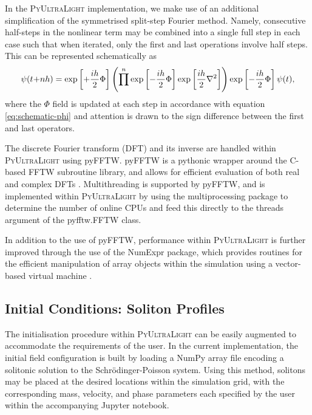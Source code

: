 \documentclass[a4paper,11pt]{article}
\newcommand{\PyUltraLight}{\textsc{PyUltraLight }}
\begin{document}
In the \PyUltraLight implementation, we make use of an additional simplification of the symmetrised split-step Fourier method. Namely, consecutive half-steps in the nonlinear term may be combined into a single full step in each case such that when iterated, only the first and last operations involve half steps. This can be represented schematically as 
\begin{equation}
    \psi(t\hspace*{-.2em}+\hspace*{-.2em}nh)=\operatorname{exp}\left[+\frac{ih}{2}\Phi\right]\left(\prod^n\operatorname{exp}\left[-\frac{ih}{2}\Phi\right]\operatorname{exp}\left[\frac{ih}{2}\nabla^2\right]\right)\operatorname{exp}\left[-\frac{ih}{2}\Phi\right]\psi(t),
\end{equation}
where the $\Phi$ field is updated at each step in accordance with equation \ref{eq:schematic-phi} and attention is drawn to the sign difference between the first and last operators.

The discrete Fourier transform (DFT) and its inverse are handled within \PyUltraLight using pyFFTW. pyFFTW is a pythonic wrapper around the C-based FFTW subroutine library, and allows for efficient evaluation of both real and complex DFTs \cite{pyfftw} \cite{fftw} \cite{Frigo2005}.  Multithreading is supported by pyFFTW, and is implemented within \PyUltraLight by using the multiprocessing package to determine the number of online CPUs and feed this directly to the threads argument of the pyfftw.FFTW class. 

In addition to the use of pyFFTW, performance within \PyUltraLight is further improved through the use of the NumExpr package, which provides routines for the efficient manipulation of array objects within the simulation using a vector-based virtual machine \cite{numexpr}. 

\subsection{Initial Conditions: Soliton Profiles}\label{sec:soliton-profiles}

The initialisation procedure within \PyUltraLight can be easily augmented to accommodate the requirements of the user. In the current implementation, the initial field configuration is built by loading a NumPy array file encoding a solitonic solution to the Schr{\"o}dinger-Poisson system. Using this method, solitons may be placed at the desired locations within the simulation grid, with the corresponding mass, velocity, and phase parameters each specified by the user within the accompanying Jupyter notebook. 
\end{document}
